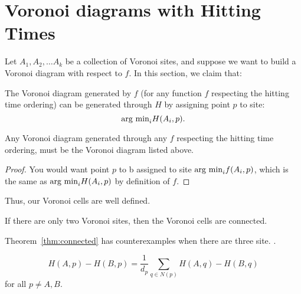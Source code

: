\section{Voronoi diagrams with Hitting Times}
Let $A_1, A_2, \ldots A_k$ be a collection of Voronoi sites, and
suppose we want to build a Voronoi diagram with respect to $f$.
In this section, we claim that:

The Voronoi diagram generated by $f$ (for any
function $f$ respecting the hitting time ordering) can be
generated through $H$ by assigning point $p$ to site:
\[ \text{arg min}_i H(A_i, p). \]

\begin{theorem} Any Voronoi diagram generated through any $f$
respecting the hitting time ordering, must be the Voronoi diagram
listed above.
\end{theorem}
\begin{proof} You would want point $p$ to b assigned to site $\text{arg min}_i f(A_i, p)$,
  which is the same as $\text{arg min}_i H(A_i, p)$ by definition of
  $f$.
\end{proof}
Thus, our Voronoi cells are well defined.

\begin{theorem}\label{thm:connected} If there are only two
Voronoi sites, then the Voronoi cells are connected.
\end{theorem}
Theorem~\ref{thm:connected} has counterexamples when there are
three site. .

\begin{lemma} \label{lem:H}
\[ H(A, p) - H(B, p) = \frac{1}{d_p} \sum_{q \in N(p)} H(A, q) - H(B, q) \]
for all $p \not= A, B$.
\end{lemma}

